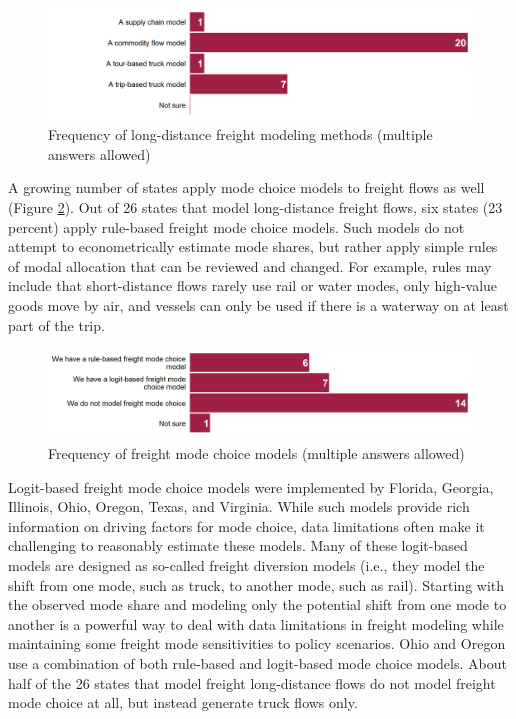 \begin{figure}   %
\centering
\includegraphics[width=6.4in]{graphics/24-freight-long-distance-methods}
\caption[Frequency of long-distance freight modeling methods]{Frequency of long-distance freight modeling methods (multiple answers allowed)}
\label{fig:freight-long-distance-methods}
\end{figure}

A growing number of states apply mode choice models to freight flows as well (Figure \ref{fig:freight-mode-choice}). Out of 26 states that model long-distance freight flows, six states (23 percent) apply rule-based freight mode choice models. Such models do not attempt to econometrically estimate mode shares, but rather apply simple rules of modal allocation that can be reviewed and changed. For example, rules may include that short-distance flows rarely use rail or water modes, only high-value goods move by air, and vessels can only be used if there is a waterway on at least part of the trip.

\begin{figure}   %
\centering
\includegraphics[width=6.4in]{graphics/25-freight-mode-choice}
\caption[Frequency of freight mode choice models]{Frequency of freight mode choice models (multiple answers allowed)}
\label{fig:freight-mode-choice}
\end{figure}

Logit-based freight mode choice models were implemented by Florida, Georgia, Illinois, Ohio, Oregon, Texas, and Virginia. While such models provide rich information on driving factors for mode choice, data limitations often make it challenging to reasonably estimate these models. Many of these logit-based models are designed as so-called freight diversion models (i.e., they model the shift from one mode, such as truck, to another mode, such as rail). Starting with the observed mode share and modeling only the potential shift from one mode to another is a powerful way to deal with data limitations in freight modeling while maintaining some freight mode sensitivities to policy scenarios. Ohio and Oregon use a combination of both rule-based and logit-based mode choice models. About half of the 26 states that model freight long-distance flows do not model freight mode choice at all, but instead generate truck flows only.

